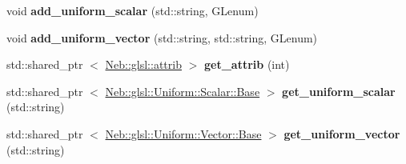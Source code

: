 \begin{DoxyCompactItemize}
\item 
\hypertarget{classNeb_1_1glsl_1_1program_a216f4da05c9652196ace84de8f6f72a4}{void {\bfseries add\-\_\-uniform\-\_\-scalar} (std\-::string, \-G\-Lenum)}\label{classNeb_1_1glsl_1_1program_a216f4da05c9652196ace84de8f6f72a4}

\item 
\hypertarget{classNeb_1_1glsl_1_1program_a74d9348322a1a141b54f47b28c8a4fe8}{void {\bfseries add\-\_\-uniform\-\_\-vector} (std\-::string, std\-::string, \-G\-Lenum)}\label{classNeb_1_1glsl_1_1program_a74d9348322a1a141b54f47b28c8a4fe8}

\item 
\hypertarget{classNeb_1_1glsl_1_1program_a22cb57ef36e27e2c6e4c888ec644d21a}{std\-::shared\-\_\-ptr\*
$<$ \hyperlink{classNeb_1_1glsl_1_1attrib}{\-Neb\-::glsl\-::attrib} $>$ {\bfseries get\-\_\-attrib} (int)}\label{classNeb_1_1glsl_1_1program_a22cb57ef36e27e2c6e4c888ec644d21a}

\item 
\hypertarget{classNeb_1_1glsl_1_1program_a2d92e57e7b3baaa0e24d52af68567327}{std\-::shared\-\_\-ptr\*
$<$ \hyperlink{classNeb_1_1glsl_1_1Uniform_1_1Scalar_1_1Base}{\-Neb\-::glsl\-::\-Uniform\-::\-Scalar\-::\-Base} $>$ {\bfseries get\-\_\-uniform\-\_\-scalar} (std\-::string)}\label{classNeb_1_1glsl_1_1program_a2d92e57e7b3baaa0e24d52af68567327}

\item 
\hypertarget{classNeb_1_1glsl_1_1program_a05a8949e3d4152aa41900eed48ebed70}{std\-::shared\-\_\-ptr\*
$<$ \hyperlink{classNeb_1_1glsl_1_1Uniform_1_1Vector_1_1Base}{\-Neb\-::glsl\-::\-Uniform\-::\-Vector\-::\-Base} $>$ {\bfseries get\-\_\-uniform\-\_\-vector} (std\-::string)}\label{classNeb_1_1glsl_1_1program_a05a8949e3d4152aa41900eed48ebed70}

\end{DoxyCompactItemize}
